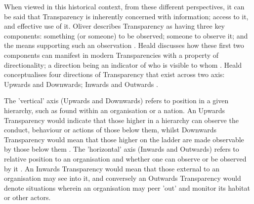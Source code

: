 When viewed in this historical context, from these different perspectives, it can be said that Transparency is inherently concerned with information; access to it, and effective use of it. Oliver describes Transparency as having three key components: something (or someone) to be observed; someone to observe it; and the means supporting such an observation \cite{oliver_what_2004}. Heald discusses how these first two components can manifest in modern Transparencies with a property of directionality; a direction being an indicator of who is visible to whom \cite{heald_varieties_2006}. Heald conceptualises four directions of Transparency that exist across two axis: Upwards and Downwards; Inwards and Outwards \cite{heald_varieties_2006}.

The 'vertical' axis (Upwards and Downwards) refers to position in a given hierarchy, such as found within an organisation or a nation. An Upwards Transparency would indicate that those higher in a hierarchy can observe the conduct, behaviour or actions of those below them, whilst Downwards Transparency would mean that those higher on the ladder are made observable by those below them \cite{heald_varieties_2006}. The 'horizontal' axis (Inwards and Outwards) refers to relative position to an organisation and whether one can observe or be observed by it \cite{heald_varieties_2006}. An Inwards Transparency would mean that those external to an organisation may see into it, and conversely an Outwards Transparency would denote situations wherein an organisation may peer 'out' and monitor its habitat or other actors.

